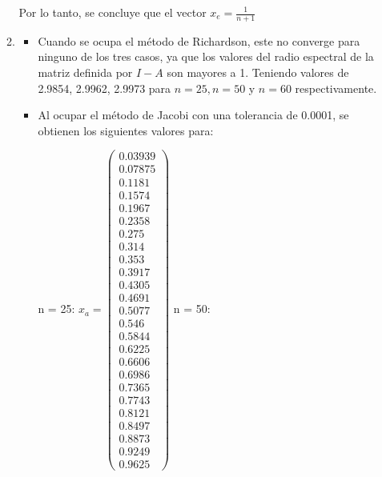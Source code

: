 \documentclass{udpreport}
\begin{document}
\begin{enumerate}
\begin{enumerate}
			Por lo tanto, se concluye que el vector $x_{e} = \frac{1}{n+1}$
			
			\item 	
			\begin{itemize}
				\item Cuando se ocupa el método de Richardson, este no converge para ninguno de los tres casos, ya que los valores del radio espectral de la matriz definida por $I-A$ son mayores a 1. Teniendo valores de 2.9854, 2.9962, 2.9973 para $n=25, n=50$ y $n=60$ respectivamente.
				
				\item Al ocupar el método de Jacobi con una tolerancia de 0.0001, se obtienen los siguientes valores para:
				
					 n = 25: 
					$x_{a} = \left(\begin{array}{c} 0.03939\\ 0.07875\\ 0.1181\\ 0.1574\\ 0.1967\\ 0.2358\\ 0.275\\ 0.314\\ 0.353\\ 0.3917\\ 0.4305\\ 0.4691\\ 0.5077\\ 0.546\\ 0.5844\\ 0.6225\\ 0.6606\\ 0.6986\\ 0.7365\\ 0.7743\\ 0.8121\\ 0.8497\\ 0.8873\\ 0.9249\\ 0.9625 \end{array}\right) $	
					 n = 50:

\end{itemize}
\end{enumerate}
\end{enumerate}
\end{document}
